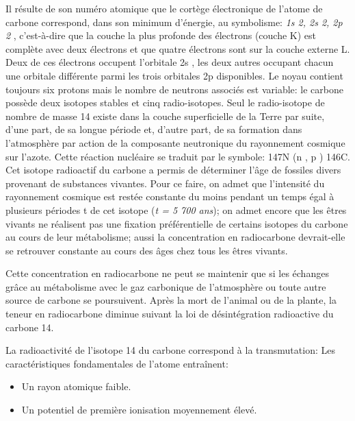 \documentclass[]{article}
\begin{document}
Il résulte de son numéro atomique que le cortège
électronique de l'atome de carbone correspond, dans son minimum
d'énergie, au symbolisme: \textit{1s 2, 2s 2, 2p 2} ,
c'est-à-dire que la couche la plus profonde des électrons
(couche K) est complète avec deux électrons et que quatre
électrons sont sur la couche externe L. Deux de ces électrons
occupent l'orbitale 2s , les deux autres occupant chacun une
orbitale différente parmi les trois orbitales 2p disponibles. Le
noyau contient toujours six protons mais le nombre de neutrons
associés est variable: le carbone possède deux isotopes stables
et cinq radio-isotopes. Seul le radio-isotope de nombre de masse 14
existe dans la couche superficielle de la Terre par suite, d'une part,
de sa longue période et, d'autre part, de sa formation dans
l'atmosphère par action de la composante neutronique du rayonnement
cosmique sur l'azote. Cette réaction nucléaire se traduit par le
symbole: 147N (n , p ) 146C. Cet isotope radioactif du
carbone a permis de déterminer l'âge de fossiles divers
provenant de substances vivantes. Pour ce faire, on admet que
l'intensité du rayonnement cosmique est restée constante du
moins pendant un temps égal à plusieurs périodes t de cet
isotope (\textit{t = 5 700 ans}); on admet encore que les êtres
vivants ne réalisent pas une fixation préférentielle de
certains isotopes du carbone au cours de leur métabolisme; aussi la
concentration en radiocarbone devrait-elle se retrouver constante au
cours des âges chez tous les êtres vivants.


Cette concentration en radiocarbone ne peut se maintenir que si les échanges grâce
au métabolisme avec le gaz carbonique de l'atmosphère ou toute
autre source de carbone se poursuivent. Après la mort de l'animal
ou de la plante, la teneur en radiocarbone diminue suivant la loi de
désintégration radioactive du carbone 14. 

La radioactivité de
l'isotope 14 du carbone correspond à la transmutation: 
Les caractéristiques fondamentales de l'atome entraînent:
\begin{itemize}
	\item Un rayon atomique faible.
	\item Un potentiel de première ionisation moyennement élevé.
\end{itemize} 
 
\end{document}
